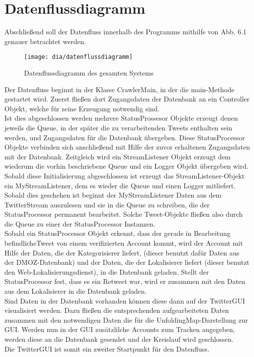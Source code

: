 \section{Datenflussdiagramm}

Abschließend soll der Datenfluss innerhalb des Programms mithilfe von Abb. 6.1 genauer betrachtet werden.\\

\begin{figure}[h!]
	\centering
	\texttt{[image: dia/datenflussdiagramm]}
	\caption{Datenflussdiagramm des gesamten Systems}
	\label{fig:datenflussdiagramm}
\end{figure}

Der Datenfluss beginnt in der Klasse CrawlerMain, in der die main-Methode gestartet wird. Zuerst fließen dort Zugangsdaten der Datenbank an ein Controller Objekt, welche für seine Erzeugung notwendig sind. \\
Ist dies abgeschlossen werden mehrere StatusProssesor Objekte erzeugt denen jeweils die Queue, in der später die zu verarbeitenden Tweets enthalten sein werden, und Zugangsdaten für die Datenbank übergeben. Diese StatusProcessor Objekte verbinden sich anschließend mit Hilfe der zuvor erhaltenen Zugangsdaten mit der Datenbank. Zeitgleich wird ein StreamListener Objekt erzeugt dem wiederum die vorhin beschriebene Queue und ein Logger Objekt übergeben wird. Sobald diese Initialisierung abgeschlossen ist erzeugt das StreamListener-Objekt ein MyStreamListener, dem es wieder die Queue und einen Logger mitliefert. Sobald dies geschehen ist beginnt der MyStreamListener Daten aus dem TwitterStream auszulesen und sie in die Queue zu schreiben, die der StatusProcessor permanent bearbeitet. Solche Tweet-Objekte fließen also durch die Queue zu einer der StatusProcessor Instanzen. \\
Sobald ein StatusProcessor Objekt erkennt, dass der gerade in Bearbeitung befindlicheTweet von einem verifizierten Account kommt, wird der Account mit Hilfe der Daten, die der Kategorisierer liefert, (dieser benutzt dafür Daten aus der DMOZ-Datenbank) und der Daten, die der Lokalisierer liefert (dieser benutzt den Web-Lokalisierungsdienst), in die Datenbank geladen. Stellt der StatusProcessor fest, dass es ein Retweet war, wird er zusammen mit den Daten aus dem Lokalisierer in die Datenbank geladen.\\
Sind Daten in der Datenbank vorhanden können diese dann auf der TwitterGUI visualisiert werden. Dazu fließen die entsprechenden aufgearbeiteten Daten zusammen mit den notwendigen Daten die für die UnfoldingMap-Darstellung zur GUI. Werden nun in der GUI zusätzlilche Accounts zum Tracken angegeben, werden diese an die Datenbank gesendet und der Kreislauf wird geschlossen.\\
Die TwitterGUI ist somit ein zweiter Startpunkt für den Datenfluss.	
